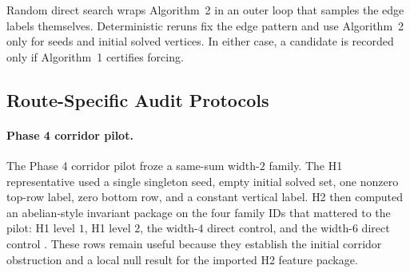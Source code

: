 \documentclass[11pt]{article}
\theoremstyle{definition}
\begin{document}
\begin{center}
\end{center}

Random direct search wraps Algorithm~2 in an outer loop that samples the edge labels themselves. Deterministic reruns fix the edge pattern and use Algorithm~2 only for seeds and initial solved vertices. In either case, a candidate is recorded only if Algorithm~1 certifies forcing.

\subsection{Route-Specific Audit Protocols}

\paragraph{Phase 4 corridor pilot.}
The Phase 4 corridor pilot froze a same-sum width-$2$ family. The \textsc{H1} representative used a single singleton seed, empty initial solved set, one nonzero top-row label, zero bottom row, and a constant vertical label. \textsc{H2} then computed an abelian-style invariant package on the four family IDs that mattered to the pilot: \textsc{H1} level $1$, \textsc{H1} level $2$, the width-$4$ direct control, and the width-$6$ direct control \citep{archivara_h1_program,archivara_h1_obstruction,archivara_h2}. These rows remain useful because they establish the initial corridor obstruction and a local null result for the imported H2 feature package.
\end{document}
